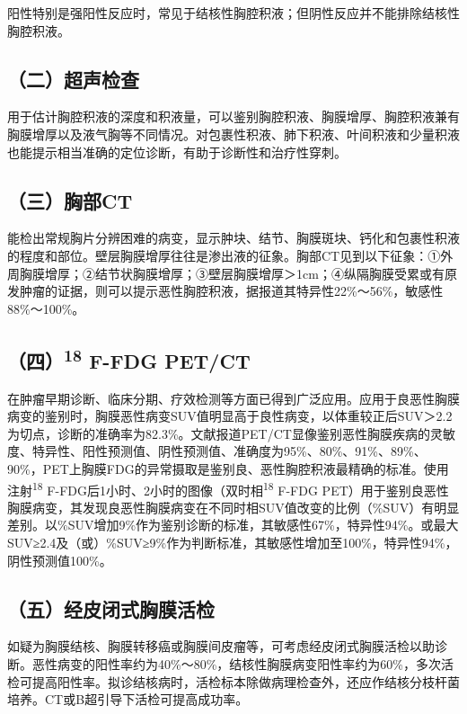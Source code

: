 阳性特别是强阳性反应时，常见于结核性胸腔积液；但阴性反应并不能排除结核性胸腔积液。

\subsection{（二）超声检查}

用于估计胸腔积液的深度和积液量，可以鉴别胸腔积液、胸膜增厚、胸腔积液兼有胸膜增厚以及液气胸等不同情况。对包裹性积液、肺下积液、叶间积液和少量积液也能提示相当准确的定位诊断，有助于诊断性和治疗性穿刺。

\subsection{（三）胸部CT}

能检出常规胸片分辨困难的病变，显示肿块、结节、胸膜斑块、钙化和包裹性积液的程度和部位。壁层胸膜增厚往往是渗出液的征象。胸部CT见到以下征象：①外周胸膜增厚；②结节状胸膜增厚；③壁层胸膜增厚＞1cm；④纵隔胸膜受累或有原发肿瘤的证据，则可以提示恶性胸腔积液，据报道其特异性22\%～56\%，敏感性88\%～100\%。

\subsection{（四）\textsuperscript{18} F-FDG PET/CT}

在肿瘤早期诊断、临床分期、疗效检测等方面已得到广泛应用。应用于良恶性胸膜病变的鉴别时，胸膜恶性病变SUV值明显高于良性病变，以体重较正后SUV＞2.2为切点，诊断的准确率为82.3\%。文献报道PET/CT显像鉴别恶性胸膜疾病的灵敏度、特异性、阳性预测值、阴性预测值、准确度为95\%、80\%、91\%、89\%、90\%，PET上胸膜FDG的异常摄取是鉴别良、恶性胸腔积液最精确的标准。使用注射\textsuperscript{18}
F-FDG后1小时、2小时的图像（双时相\textsuperscript{18} F-FDG
PET）用于鉴别良恶性胸膜病变，其发现良恶性胸膜病变在不同时相SUV值改变的比例（\%SUV）有明显差别。以\%SUV增加9\%作为鉴别诊断的标准，其敏感性67\%，特异性94\%。或最大SUV≥2.4及（或）\%SUV≥9\%作为判断标准，其敏感性增加至100\%，特异性94\%，阴性预测值100\%。

\subsection{（五）经皮闭式胸膜活检}

如疑为胸膜结核、胸膜转移癌或胸膜间皮瘤等，可考虑经皮闭式胸膜活检以助诊断。恶性病变的阳性率约为40\%～80\%，结核性胸膜病变阳性率约为60\%，多次活检可提高阳性率。拟诊结核病时，活检标本除做病理检查外，还应作结核分枝杆菌培养。CT或B超引导下活检可提高成功率。

